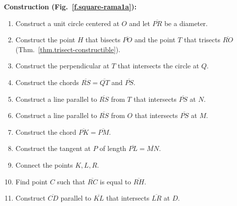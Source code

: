 \textbf{Construction (Fig.~\ref{f.square-rama1a}):}
\begin{enumerate}

\item Construct a unit circle centered at $O$ and let $\overline{PR}$ be a diameter.

\item Construct the point $H$ that bisects $\overline{PO}$ and the point $T$ that trisects $\overline{RO}$ (Thm.~\ref{thm.trisect-constructible}).

\item Construct the  perpendicular at $T$ that intersects the circle at $Q$.

\item Construct the chords $\overline{RS}=\overline{QT}$ and $\overline{PS}$.

\item Construct a line parallel to $\overline{RS}$ from $T$ that intersects $\overline{PS}$ at $N$.

\item Construct a line parallel to $\overline{RS}$ from $O$ that intersects $\overline{PS}$ at $M$.

\item Construct the chord $\overline{PK}=\overline{PM}$.

\item Construct the tangent at $P$ of length $\overline{PL}=\overline{MN}$.

\item Connect the points $K,L,R$.

\item Find point $C$ such that $\overline{RC}$ is equal to $\overline{RH}$.

\item Construct $\overline{CD}$ parallel to $\overline{KL}$ that intersects $\overline{LR}$ at $D$. 
\end{enumerate}

